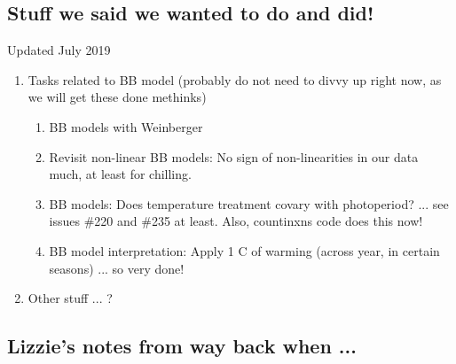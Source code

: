 \documentclass[11pt,letterpaper]{article}
\begin{document}
\subsection{Stuff we said we wanted to do and did!}
Updated July 2019
\begin{enumerate}

\item Tasks related to BB model (probably do not need to divvy up right now, as we will get these done methinks)
\begin{enumerate}
\item BB models with Weinberger
\item Revisit non-linear BB models: No sign of non-linearities in our data much, at least for chilling. 
\item BB models: Does temperature treatment covary with photoperiod? ... see issues \#220 and \#235 at least. Also, countinxns code does this now!
\item BB model interpretation: Apply 1 C of warming (across year, in certain seasons) ... so very done!
\end{enumerate}
\item Other stuff ... ?
\end{enumerate}

\subsection{Lizzie's notes from way back when ...}
\end{document}
